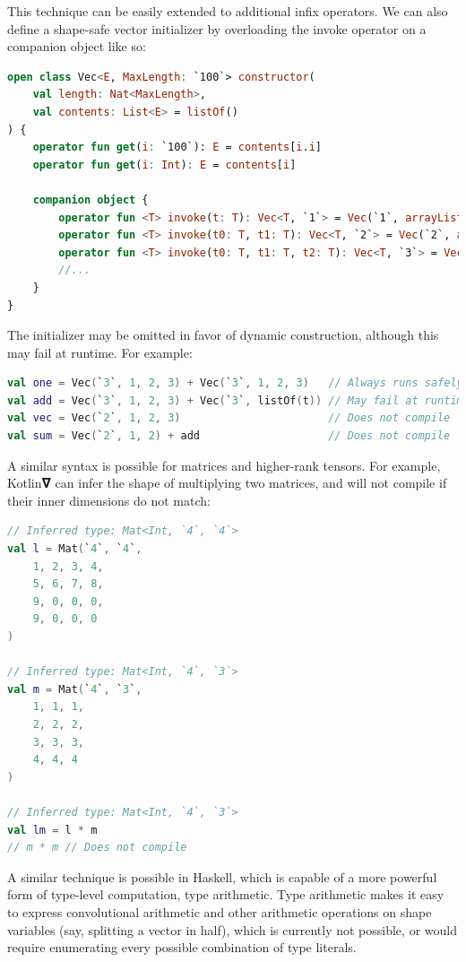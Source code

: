 \documentclass[12pt,initial,twoside,maitrise]{dms}
\numberwithin{equation}{section}
\numberwithin{table}{chapter}
\numberwithin{figure}{chapter}
\begin{document}
This technique can be easily extended to additional infix operators. We can also define a shape-safe vector initializer by overloading the invoke operator on a companion object like so:

\begin{lstlisting}[caption={Simple code listing.}, language=Kotlin]
open class Vec<E, MaxLength: `100`> constructor(
    val length: Nat<MaxLength>,
    val contents: List<E> = listOf()
) {
    operator fun get(i: `100`): E = contents[i.i]
    operator fun get(i: Int): E = contents[i]

    companion object {
        operator fun <T> invoke(t: T): Vec<T, `1`> = Vec(`1`, arrayListOf(t))
        operator fun <T> invoke(t0: T, t1: T): Vec<T, `2`> = Vec(`2`, arrayListOf(t0, t1))
        operator fun <T> invoke(t0: T, t1: T, t2: T): Vec<T, `3`> = Vec(`3`, arrayListOf(t0, t1, t2))
        //...
    }
}
\end{lstlisting}

The initializer may be omitted in favor of dynamic construction, although this may fail at runtime. For example:

\begin{lstlisting}[caption={Simple code listing.}, language=Kotlin]
val one = Vec(`3`, 1, 2, 3) + Vec(`3`, 1, 2, 3)   // Always runs safely
val add = Vec(`3`, 1, 2, 3) + Vec(`3`, listOf(t)) // May fail at runtime
val vec = Vec(`2`, 1, 2, 3)                       // Does not compile
val sum = Vec(`2`, 1, 2) + add                    // Does not compile
\end{lstlisting}

A similar syntax is possible for matrices and higher-rank tensors. For example, Kotlin𝛁 can infer the shape of multiplying two matrices, and will not compile if their inner dimensions do not match:

\begin{lstlisting}[caption={Further examples are provided for shape-safe matrix operations such as addition, subtraction and transposition.}, language=Kotlin]
// Inferred type: Mat<Int, `4`, `4`>
val l = Mat(`4`, `4`,
    1, 2, 3, 4,
    5, 6, 7, 8,
    9, 0, 0, 0,
    9, 0, 0, 0
)

// Inferred type: Mat<Int, `4`, `3`>
val m = Mat(`4`, `3`,
    1, 1, 1,
    2, 2, 2,
    3, 3, 3,
    4, 4, 4
)

// Inferred type: Mat<Int, `4`, `3`>
val lm = l * m
// m * m // Does not compile
\end{lstlisting}

A similar technique is possible in Haskell, which is capable of a more powerful form of type-level computation, type arithmetic. Type arithmetic makes it easy to express convolutional arithmetic and other arithmetic operations on shape variables (say, splitting a vector in half), which is currently not possible, or would require enumerating every possible combination of type literals.
\end{document}
